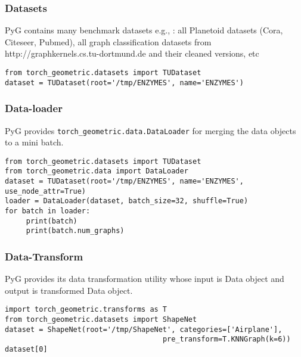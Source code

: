 \begin{frame}[fragile]\frametitle{Datasets}

PyG contains many benchmark datasets e.g., : all Planetoid datasets (Cora, Citeseer, Pubmed), all graph classification datasets from http://graphkernels.cs.tu-dortmund.de and their cleaned versions, etc


\begin{lstlisting}
from torch_geometric.datasets import TUDataset
dataset = TUDataset(root='/tmp/ENZYMES', name='ENZYMES')
\end{lstlisting}

\end{frame}

\begin{frame}[fragile]\frametitle{Data-loader}

PyG provides \lstinline|torch_geometric.data.DataLoader| for merging the data objects to a mini batch.

\begin{lstlisting}
from torch_geometric.datasets import TUDataset
from torch_geometric.data import DataLoader
dataset = TUDataset(root='/tmp/ENZYMES', name='ENZYMES', use_node_attr=True)
loader = DataLoader(dataset, batch_size=32, shuffle=True)
for batch in loader:
	 print(batch)
	 print(batch.num_graphs)
\end{lstlisting}

\end{frame}

\begin{frame}[fragile]\frametitle{Data-Transform}

PyG provides its data transformation utility whose input is Data object and output is transformed Data object.

\begin{lstlisting}
import torch_geometric.transforms as T
from torch_geometric.datasets import ShapeNet
dataset = ShapeNet(root='/tmp/ShapeNet', categories=['Airplane'],
									 pre_transform=T.KNNGraph(k=6))
dataset[0] 
\end{lstlisting}

\end{frame}

